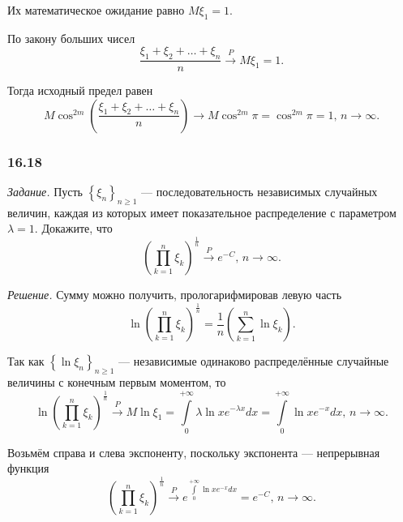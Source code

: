 \begin{enumerate}[label=\alph*)]
Их математическое ожидание равно $M \xi_1 = 1$.

По закону больших чисел
$$ \frac{ \xi_1 + \xi_2 + \dotsc + \xi_n}{n} \overset{P}{ \rightarrow } M \xi_1 = 1.$$

Тогда исходный предел равен
$$M \cos^{2m} \left( \frac{ \xi_1 + \xi_2 + \dotsc + \xi_n}{n} \right) \to M \cos^{2m} \pi =
\cos^{2m} \pi = 1, \,
n \to \infty.$$
\end{enumerate}

\subsubsection*{16.18}

\textit{Задание.}
Пусть $ \left\{ \xi_n \right\}_{n \geq 1}$ --- последовательность независимых случайных величин,
каждая из которых имеет показательное распределение с параметром $ \lambda = 1$.
Докажите, что
$$ \left( \prod \limits_{k = 1}^n \xi_k \right)^{ \frac{1}{n}} \overset{P}{ \rightarrow } e^{-C}, \,
  n \to \infty.$$

\textit{Решение.} Сумму можно получить, прологарифмировав левую часть
$$ \ln \left( \prod \limits_{k = 1}^n \xi_k \right)^{ \frac{1}{n}} =
  \frac{1}{n} \left( \sum \limits_{k = 1}^n \ln \xi_k \right).$$

Так как $ \left\{ \ln \xi_n \right\}_{n \geq 1}$ ---
независимые одинаково распределённые случайные величины с конечным первым моментом, то
$$ \ln \left( \prod \limits_{k = 1}^n \xi_k \right)^{ \frac{1}{n}} \overset{P}{ \rightarrow }
  M \ln \xi_1 =
  \int \limits_0^{+ \infty } \lambda \ln x e^{- \lambda x} dx =
  \int \limits_0^{+ \infty } \ln x e^{- x} dx, \,
  n \to \infty.$$

Возьмём справа и слева экспоненту, поскольку экспонента --- непрерывная функция
$$ \left( \prod \limits_{k = 1}^n \xi_k \right)^{ \frac{1}{n}} \overset{P}{ \rightarrow }
  e^{ \int \limits_0^{+ \infty } \ln x e^{-x} dx} =
  e^{-C}, \,
  n \to \infty.$$

